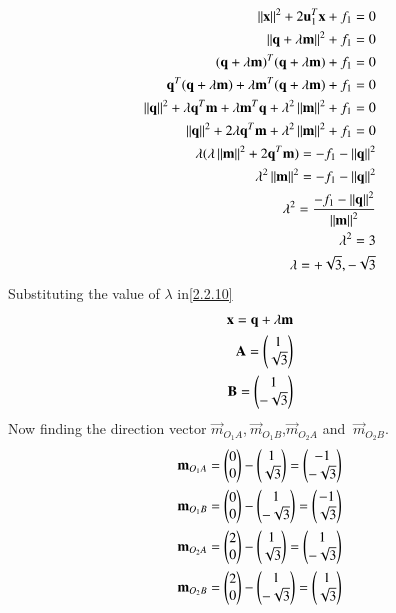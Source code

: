 \documentclass[journal,12pt,twocolumn]{IEEEtran}
\begin{document}
  \begin{align}
 \left\lVert\mathbf{x}\right\rVert^2 + 2\mathbf{u}_1^T\mathbf{x} + f_1 = 0\\
 \left\lVert\mathbf{q}+\lambda\mathbf{m}\right\rVert^2 + f_1 = 0\\
 (\mathbf{q}+\lambda \mathbf{m})^T(\mathbf{q}+\lambda \mathbf{m})+f_1=0\\
 \mathbf{q}^T(\mathbf{q}+\lambda \mathbf{m})+\lambda \mathbf{m}^T(\mathbf{q}+\lambda \mathbf{m})+f_1=0\\
 \left\lVert\mathbf{q}\right\rVert^2+\lambda\mathbf{q}^T\mathbf{m}+\lambda\mathbf{m}^T\mathbf{q}+\lambda^2\left\lVert\mathbf{m}\right\rVert^2+f_1=0\\
 \left\lVert\mathbf{q}\right\rVert^2+2\lambda\mathbf{q}^T\mathbf{m}+\lambda^2\left\lVert\mathbf{m}\right\rVert^2+f_1=0 \\
\lambda(\lambda\left\lVert\mathbf{m}\right\rVert^2+2\mathbf{q}^T\mathbf{m})=-f_1-\left\lVert\mathbf{q}\right\rVert^2\\
\lambda^2\left\lVert\mathbf{m}\right\rVert^2=-f_1-\left\lVert\mathbf{q}\right\rVert^2\\
\lambda^2=\frac{-f_1-\left\lVert\mathbf{q}\right\rVert^2}{\left\lVert\mathbf{m}\right\rVert^2}\\
\lambda^2=3\\
 \lambda=+\sqrt{3},-\sqrt{3}
 \end{align}
Substituting the value of $\lambda$ in\eqref{2.2.10}
\begin{align}
\mathbf{x}=\mathbf{q}+\lambda\mathbf{m}\\
\mathbf{A}=\begin{pmatrix}1\\\sqrt{3}\end{pmatrix}\\
\mathbf{B}=\begin{pmatrix}1\\-\sqrt{3}\end{pmatrix}
 \end{align} 
 Now finding the direction vector $ \vec{m}_{O_1A}$,$\ \vec{m}_{O_1B}$,$ \vec{m}_{O_2A}$ and $\ \vec{m}_{O_2B}$.
\begin{align}
\mathbf{m}_{O_1A}=\begin{pmatrix}0\\0\end{pmatrix}-\begin{pmatrix}1\\\sqrt{3}\end{pmatrix}=\begin{pmatrix}-1\\-\sqrt{3}\end{pmatrix}\\
\mathbf{m}_{O_1B}=\begin{pmatrix}0\\0\end{pmatrix}-\begin{pmatrix}1\\-\sqrt{3}\end{pmatrix}=\begin{pmatrix}-1\\\sqrt{3}\end{pmatrix}\\
\mathbf{m}_{O_2A}=\begin{pmatrix}2\\0\end{pmatrix}-\begin{pmatrix}1\\\sqrt{3}\end{pmatrix}=\begin{pmatrix}1\\-\sqrt{3}\end{pmatrix}\\
\mathbf{m}_{O_2B}=\begin{pmatrix}2\\0\end{pmatrix}-\begin{pmatrix}1\\-\sqrt{3}\end{pmatrix}=\begin{pmatrix}1\\\sqrt{3}\end{pmatrix}
\end{align}
\end{document}
